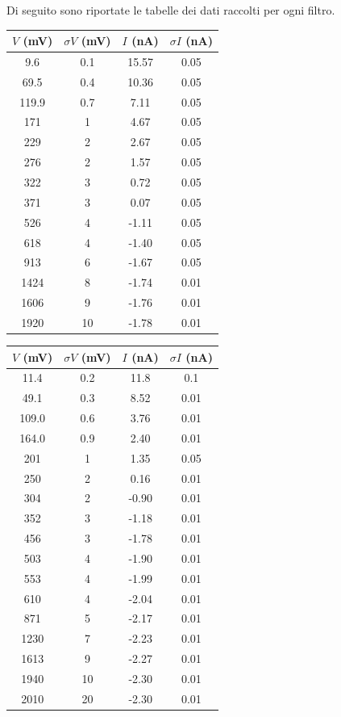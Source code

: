 \documentclass[10pt,a4paper]{article}
\begin{document}
Di seguito sono riportate le tabelle dei dati raccolti per ogni filtro. %
\\
\begin{table}[!ht]
\begin{tabular}{|c|c|c|c|}
\hline
$V$ (mV) & $\sigma V$ (mV) & $I$ (nA) & $\sigma I$ (nA)\\
\hline
9.6 & 0.1 & 15.57 & 0.05\\
69.5 & 0.4 & 10.36 & 0.05\\
119.9 & 0.7 & 7.11 & 0.05\\
171 & 1 & 4.67 & 0.05\\
229 & 2 & 2.67 & 0.05\\
276 & 2 & 1.57 & 0.05\\
322 & 3 & 0.72 & 0.05\\
371 & 3 & 0.07 & 0.05\\
526 & 4 & -1.11 & 0.05\\
618 & 4 & -1.40 & 0.05\\
913 & 6 & -1.67 & 0.05\\
1424 & 8 & -1.74 & 0.01\\
1606 & 9 & -1.76 & 0.01\\
1920 & 10 & -1.78 & 0.01\\
\hline
\end{tabular}
\begin{tabular}{|c|c|c|c|}
\hline
$V$ (mV) & $\sigma V$ (mV) & $I$ (nA) & $\sigma I$ (nA)\\
\hline
11.4 & 0.2 & 11.8 & 0.1\\
49.1 & 0.3 & 8.52 & 0.01\\
109.0 & 0.6 & 3.76 & 0.01\\
164.0 & 0.9 & 2.40 & 0.01\\
201 & 1 & 1.35 & 0.05\\
250 & 2 & 0.16 & 0.01\\
304 & 2 & -0.90 & 0.01\\
352 & 3 & -1.18 & 0.01\\
456 & 3 & -1.78 & 0.01\\
503 & 4 & -1.90 & 0.01\\
553 & 4 & -1.99 & 0.01\\
610 & 4 & -2.04 & 0.01\\
871 & 5 & -2.17 & 0.01\\
1230 & 7 & -2.23 & 0.01\\
1613 & 9 & -2.27 & 0.01\\
1940 & 10 & -2.30 & 0.01\\
2010 & 20 & -2.30 & 0.01\\

\end{tabular}
\end{table}
\end{document}
